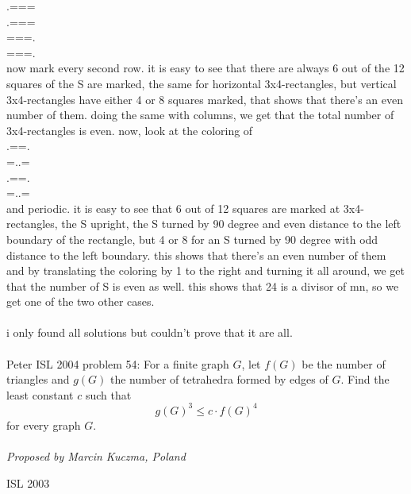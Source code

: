 .=== \\
.=== \\
===. \\
===. \\
now mark every second row. it is easy to see that there are always 6 out of the 12 squares of the S are marked, the same for horizontal 3x4-rectangles, but vertical 3x4-rectangles have either 4 or 8 squares marked, that shows that there's an even number of them. doing the same with columns, we get that the total number of 3x4-rectangles is even. now, look at the coloring of \\
.==. \\
=..= \\
.==. \\
=..= \\
and periodic. it is easy to see that 6 out of 12 squares are marked at 3x4-rectangles, the S upright, the S turned by 90 degree and even distance to the left boundary of the rectangle, but 4 or 8 for an S turned by 90 degree with odd distance to the left boundary. this shows that there's an even number of them and by translating the coloring by 1 to the right and turning it all around, we get that the number of S is even as well. this shows that 24 is a divisor of mn, so we get one of the two other cases. \\\\
i only found all solutions but couldn't prove that it are all. \\\\
Peter 
ISL 2004 problem 54:  For a finite graph $G$, let $f(G)$ be the number of triangles and $g(G)$ the number of tetrahedra formed by edges of $G$. Find the least constant $c$ such that
\[ g(G)^3\le c\cdot f(G)^4 \]
for every graph $G$. \\\\
\textit{Proposed by Marcin Kuczma, Poland } 

ISL 2003 

